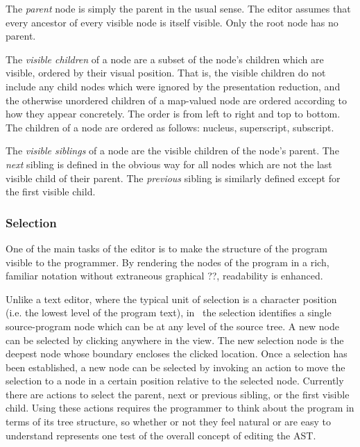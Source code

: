 The \emph{parent} node is simply the parent in the usual sense. The editor assumes that every ancestor of every visible node is itself visible. Only the root node has no parent.

The \emph{visible children} of a node are a subset of the node's children which are visible, ordered by their visual position. That is, the visible children do not include any child nodes which were ignored by the presentation reduction, and the otherwise unordered children of a map-valued node are ordered according to how they appear concretely. The order is from left to right and top to bottom. The children of a  node are ordered as follows: nucleus, superscript, subscript.

The \emph{visible siblings} of a node are the visible children of the node's parent. The \emph{next} sibling is defined in the obvious way for all nodes which are not the last visible child of their parent. The \emph{previous} sibling is similarly defined except for the first visible child.



\subsubsection{Selection}
One of the main tasks of the editor is to make the structure of the program visible to the programmer. By rendering the nodes of the program in a rich, familiar notation without extraneous graphical ??, readability is enhanced. 

Unlike a text editor, where the typical unit of selection is a character position (i.e. the lowest level of the program text), in \Meta\ the selection identifies a single source-program node which can be at any level of the source tree. A new node can be selected by clicking anywhere in the view. The new selection node is the deepest node whose boundary encloses the clicked location. Once a selection has been established, a new node can be selected by invoking an action to move the selection to a node in a certain position relative to the selected node. Currently there are actions to select the parent, next or previous sibling, or the first visible child. Using these actions requires the programmer to think about the program in terms of its tree structure, so whether or not they feel natural or are easy to understand represents one test of the overall concept of editing the AST.

